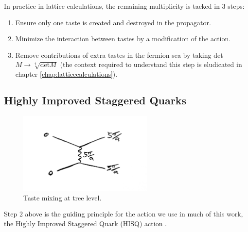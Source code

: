     In practice in lattice calculations, the remaining multiplicity is tacked in 3 steps:
    \begin{enumerate}
    \item
      Ensure only one taste is created and destroyed in the propagator.
    \item
      Minimize the interaction between tastes by a modification of the action.
    \item
      Remove contributions of extra tastes in the fermion sea by taking det$M \to \sqrt[4]{\text{det}M}$ (the context required to understand this step is eludicated in chapter \ref{chap:latticecalculations}).
    \end{enumerate}


    \subsection{Highly Improved Staggered Quarks}
    \label{sec:HISQ}

    \begin{figure}
      \vspace{-10pt}
      \begin{center}
        \includegraphics[width=
          0.6\textwidth]{images/taste_exchange.jpg}
      \end{center}
      \vspace{-30pt}
      \caption{Taste mixing at tree level.}
      \label{fig:tastemixing}
    \end{figure}

    Step 2 above is the guiding principle for the action we use in much of this work, the Highly Improved Staggered Quark (HISQ) action \cite{Follana:2006rc}.


